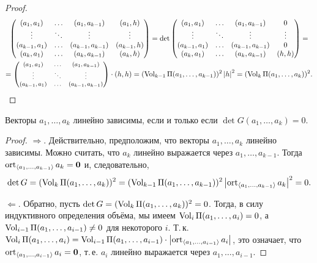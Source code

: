 \begin{proof}
\begin{multline*}
\begin{pmatrix}
            (a_1, a_1) & \ldots & (a_1, a_{k - 1}) & (a_1, h)\\
            \vdots & \ddots & \vdots & \vdots\\
            (a_{k - 1}, a_1) & \ldots & (a_{k - 1}, a_{k - 1}) & (a_{k - 1}, h)\\
            (a_k, a_1) & \ldots & (a_k, a_{k - 1}) & (a_k, h)
        \end{pmatrix} = \det
        \begin{pmatrix}
            (a_1, a_1) & \ldots & (a_1, a_{k - 1}) & 0\\
            \vdots & \ddots & \vdots & \vdots\\
            (a_{k - 1}, a_1) & \ldots & (a_{k - 1}, a_{k - 1}) & 0\\
            (a_k, a_1) & \ldots & (a_k, a_{k - 1}) & (h, h)
        \end{pmatrix} =\\\footnotesize =
        \begin{pmatrix}
            (a_1, a_1) & \ldots & (a_1, a_{k - 1})\\
            \vdots & \ddots & \vdots\\
            (a_{k - 1}, a_1) & \ldots & (a_{k - 1}, a_{k - 1})\\
        \end{pmatrix} \cdot (h, h) = (\operatorname{Vol}_{k - 1}\Pi(a_1, \ldots, a_{k - 1}))^2\left\lvert h\right\rvert^2 = (\operatorname{Vol}_k\Pi(a_1, \ldots, a_k))^2.
    \end{multline*}
\end{proof}

\begin{corollary}
    Векторы $a_1, \ldots, a_k$ линейно зависимы, если и только если $\det G(a_1, \ldots, a_k) = 0$.
\end{corollary}

\begin{proof}
    $\Rightarrow$. Действительно, предположим, что векторы $a_1, \ldots, a_k$ линейно зависимы. Можно считать, что $a_k$ линейно выражается через $a_1, \ldots, a_{k - 1}$. Тогда $\operatorname{ort}_{\langle a_1, \ldots, a_{k - 1}\rangle}a_k = \boldsymbol{0}$ и, следовательно,
    \[
    \det G = (\operatorname{Vol}_k\Pi(a_1, \ldots, a_k))^2 = (\operatorname{Vol}_{k - 1}\Pi(a_1, \ldots, a_{k - 1}))^2\left\lvert\operatorname{ort}_{\langle a_1, \ldots, a_{k - 1}\rangle}a_k\right\rvert^2 = 0.
    \]
    
    $\Leftarrow$. Обратно, пусть $\det G = (\operatorname{Vol}_k\Pi(a_1, \ldots, a_k))^2 = 0$. Тогда, в силу индуктивного определения объёма, мы имеем $\operatorname{Vol}_i\Pi(a_1, \ldots, a_i) = 0$, а $\operatorname{Vol}_{i - 1}\Pi(a_1, \ldots, a_{i - 1}) \ne 0$ для некоторого $i$. Т.\,к. $\operatorname{Vol}_i\Pi(a_1, \ldots, a_i) = \operatorname{Vol}_{i - 1}\Pi(a_1, \ldots, a_{i - 1}) \cdot \left\lvert\operatorname{ort}_{\langle a_1, \ldots, a_{i - 1}\rangle}a_i\right\rvert$, это означает, что $\operatorname{ort}_{\langle a_1, \ldots, a_{i - 1}\rangle}a_i = \boldsymbol{0}$, т.\,е. $a_i$ линейно выражается через $a_1, \ldots, a_{i - 1}$.
\end{proof}

